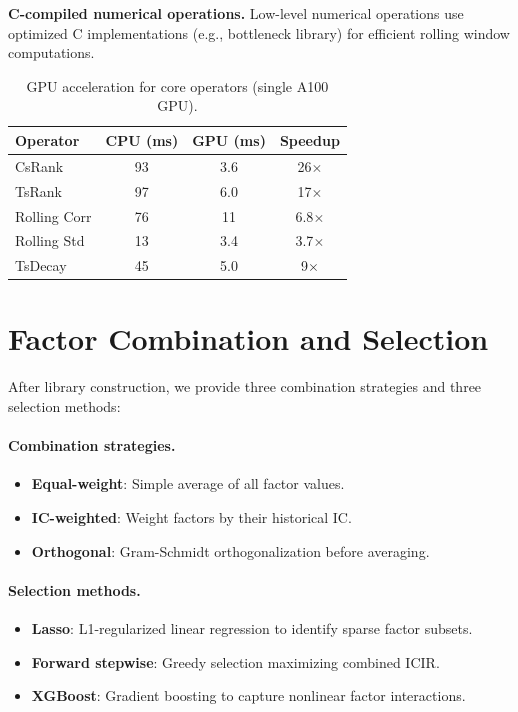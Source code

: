 \documentclass[sigconf]{acmart}
\begin{document}
\textbf{C-compiled numerical operations.}
Low-level numerical operations use optimized C implementations (e.g., bottleneck library) for efficient rolling window computations.

\begin{table}[h]
  \caption{GPU acceleration for core operators (single A100 GPU).}
  \label{tab:gpu-speedup}
  \centering
  \begin{small}
  \begin{tabular}{lccc}
    \toprule
    Operator & CPU (ms) & GPU (ms) & Speedup \\
    \midrule
    CsRank & 93 & 3.6 & 26$\times$ \\
    TsRank & 97 & 6.0 & 17$\times$ \\
    Rolling Corr & 76 & 11 & 6.8$\times$ \\
    Rolling Std & 13 & 3.4 & 3.7$\times$ \\
    TsDecay & 45 & 5.0 & 9$\times$ \\
    \bottomrule
  \end{tabular}
  \end{small}
\end{table}

\section{Factor Combination and Selection}
\label{app:combination}

After library construction, we provide three combination strategies and three selection methods:

\paragraph{Combination strategies.}
{\setlength{\leftmargini}{1.4em}%
\begin{itemize}
  \item \textbf{Equal-weight}: Simple average of all factor values.
  \item \textbf{IC-weighted}: Weight factors by their historical IC.
  \item \textbf{Orthogonal}: Gram-Schmidt orthogonalization before averaging.
\end{itemize}
}

\paragraph{Selection methods.}
{\setlength{\leftmargini}{1.4em}%
\begin{itemize}
  \item \textbf{Lasso}: L1-regularized linear regression to identify sparse factor subsets.
  \item \textbf{Forward stepwise}: Greedy selection maximizing combined ICIR.
  \item \textbf{XGBoost}: Gradient boosting to capture nonlinear factor interactions.
\end{itemize}
}
\end{document}
